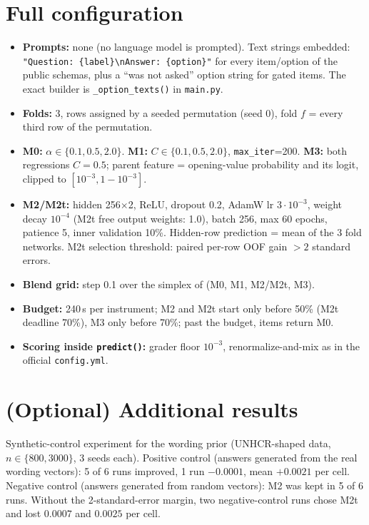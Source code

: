 \documentclass{article}
\begin{document}



\clearpage
\appendix

\section{Full configuration}
\begin{itemize}[leftmargin=*]
  \item \textbf{Prompts:} none (no language model is prompted). Text strings embedded: \texttt{"Question: \{label\}\textbackslash nAnswer: \{option\}"} for every item/option of the public schemas, plus a ``was not asked'' option string for gated items. The exact builder is \texttt{\_option\_texts()} in \texttt{main.py}.
  \item \textbf{Folds:} 3, rows assigned by a seeded permutation (seed 0), fold $f$ = every third row of the permutation.
  \item \textbf{M0:} $\alpha\in\{0.1,0.5,2.0\}$. \textbf{M1:} $C\in\{0.1,0.5,2.0\}$, \texttt{max\_iter}=200. \textbf{M3:} both regressions $C=0.5$; parent feature = opening-value probability and its logit, clipped to $[10^{-3},1-10^{-3}]$.
  \item \textbf{M2/M2t:} hidden 256$\times$2, ReLU, dropout 0.2, AdamW lr $3\cdot10^{-3}$, weight decay $10^{-4}$ (M2t free output weights: 1.0), batch 256, max 60 epochs, patience 5, inner validation 10\%. Hidden-row prediction = mean of the 3 fold networks. M2t selection threshold: paired per-row OOF gain $>2$ standard errors.
  \item \textbf{Blend grid:} step 0.1 over the simplex of (M0, M1, M2/M2t, M3).
  \item \textbf{Budget:} 240\,s per instrument; M2 and M2t start only before 50\% (M2t deadline 70\%), M3 only before 70\%; past the budget, items return M0.
  \item \textbf{Scoring inside \texttt{predict()}:} grader floor $10^{-3}$, renormalize-and-mix as in the official \texttt{config.yml}.
\end{itemize}

\section{(Optional) Additional results}
Synthetic-control experiment for the wording prior (UNHCR-shaped data, $n\in\{800,3000\}$, 3 seeds each). Positive control (answers generated from the real wording vectors): 5 of 6 runs improved, 1 run $-0.0001$, mean $+0.0021$ per cell. Negative control (answers generated from random vectors): M2 was kept in 5 of 6 runs. Without the 2-standard-error margin, two negative-control runs chose M2t and lost $0.0007$ and $0.0025$ per cell.
\end{document}
